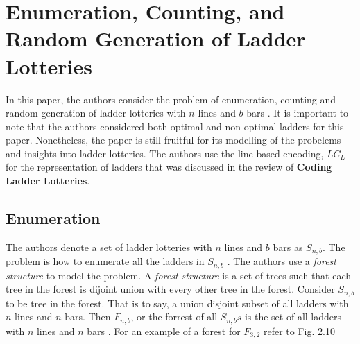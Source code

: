 \section{Enumeration, Counting, and Random Generation of Ladder Lotteries}

In this paper, the authors consider the problem of enumeration, counting and 
random generation of ladder-lotteries with $n$ lines and $b$ bars \cite{A6}. 
It is important to note that the authors considered both optimal and 
non-optimal ladders for this paper. Nonetheless, the paper is still fruitful 
for its modelling of the probelems and insights into ladder-lotteries.
The authors use  the line-based encoding, $LC_{L}$ for the representation of ladders 
that was discussed in the review of \textbf{Coding Ladder Lotteries}.

\subsection{Enumeration}
The authors denote a set of ladder lotteries with $n$ lines and 
$b$ bars as $S_{n,b}$. The problem is how to enumerate all the 
ladders in $S_{n,b}$ \cite{A6}. The authors use a \emph{forest structure}
to model the problem. A \emph{forest structure} is a set of trees 
such that each tree in the forest is dijoint union with every other 
tree in the forest. Consider $S_{n,b}$ to be tree in the forest.
That is to say, a union disjoint subset of all ladders with $n$
lines and $n$ bars. Then $F_{n,b}$, or the forrest of all $S_{n,b}s$
is the set of all ladders with $n$ lines and $n$ bars \cite{A6}. For an example 
of a forest for $F_{3,2}$ refer to Fig. 2.10\par %

